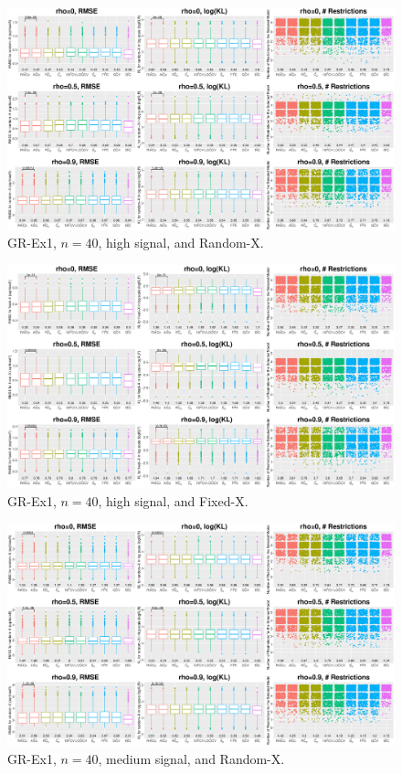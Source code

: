 \clearpage
\begin{figure}[!ht]
\centering
\includegraphics[width=\textwidth]{figures/supplement/randomx_GR-Ex1_n40_hsnr.eps}
\caption{GR-Ex1, $n=40$, high signal, and Random-X.}
\end{figure}
\begin{figure}[!ht]
\centering
\includegraphics[width=\textwidth]{figures/supplement/fixedx_GR-Ex1_n40_hsnr.eps}
\caption{GR-Ex1, $n=40$, high signal, and Fixed-X.}
\end{figure}
\clearpage
\begin{figure}[!ht]
\centering
\includegraphics[width=\textwidth]{figures/supplement/randomx_GR-Ex1_n40_msnr.eps}
\caption{GR-Ex1, $n=40$, medium signal, and Random-X.}
\end{figure}
